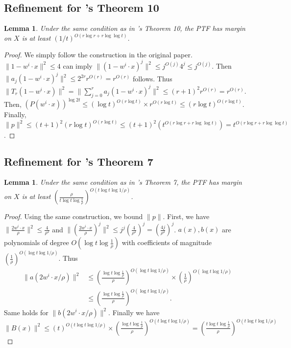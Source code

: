\documentclass{article}
\newtheorem{lemma}[theorem]{Lemma}
\begin{document}
\subsection{Refinement for \cite{klivans2004learning}'s Theorem 10}
\begin{lemma}
Under the same condition as in \cite{klivans2004learning}'s Theorem 10, the PTF has margin on $X$ is at least $(1/t)^{O(r\log r + r\log\log t)}$. 
\end{lemma}
\begin{proof}
We simply follow the construction in the original paper. $\|1-w^i\cdot x\|^2\leq 4$ can imply $\|(1-w^i\cdot x)^j\|^2\leq j^{O(j)}4^j \leq j^{O(j)}$. Then $\|a_j(1-w^i\cdot x)^j\|^2\leq 2^{2r}r^{O(r)}=r^{O(r)}$ follows. Thus $\|T_r(1-w^i\cdot x)\|^2=\|\sum_{j=0}^r a_j (1-w^i\cdot x)^j\|^2 \leq (r+1)^2 r^{O(r)} = r^{O(r)}$. Then, $\left(P(w^i\cdot x)\right)^{\log 2t}\leq (\log t)^{O(r\log t)}\times r^{O(r\log t)}\leq (r\log t)^{O(r\log t)}$. Finally, $\|p\|^2\leq (t+1)^2 (r\log t)^{O(r\log t)} \leq (t+1)^2 \left(  t^{O(r\log r + r\log\log t)}\right) = t^{O(r\log r + r\log\log t)}$.  
\end{proof}

\subsection{Refinement for \cite{klivans2004learning}'s Theorem 7}
\begin{lemma}
Under the same condition as in \cite{klivans2004learning}'s Theorem 7, the PTF has margin on $X$ is at least $\left( \frac{\rho}{t\log t \log \frac{1}{\rho}} \right)^{O(t\log t\log 1/\rho)}$. 
\end{lemma}
\begin{proof}
Using the same construction, we bound $\|p\|$. First, we have $\|\frac{2w^i\cdot x}{\rho}\|^2\leq \frac{4}{\rho^2}$ and $\|\left(\frac{2w^i\cdot x}{\rho}\right)^j\|^2\leq j^j\left(\frac{4}{\rho^2}\right)^j=\left(\frac{4j}{\rho^2}\right)^j$. $a(x), b(x)$ are polynomials of degree $O(\log t\log \frac{1}{\rho})$ with coefficients of magnitude $\left(\frac{1}{\rho}\right)^{O(\log t\log 1/\rho)}$. Thus 
\begin{align*}
    \|a(2w^i\cdot x/\rho)\|^2 &\leq 
    \left( \frac{\log t \log \frac{1}{\rho}}{\rho} \right)^{O(\log t\log 1/\rho)}  \times  \left(\frac{1}{\rho}\right)^{O(\log t\log 1/\rho)}\\
    &\leq \left( \frac{\log t \log \frac{1}{\rho}}{\rho} \right)^{O(\log t\log 1/\rho)}.
\end{align*}
Same holds for $\|b(2w^i\cdot x/\rho)\|^2$. Finally we have $\|B(x)\|^2 \leq (t)^{O(t\log t\log 1/\rho)} \times \left( \frac{\log t \log \frac{1}{\rho}}{\rho} \right)^{O(t\log t\log 1/\rho)} = \left( \frac{t\log t \log \frac{1}{\rho}}{\rho} \right)^{O(t\log t\log 1/\rho)}$


\end{proof}
\end{document}
